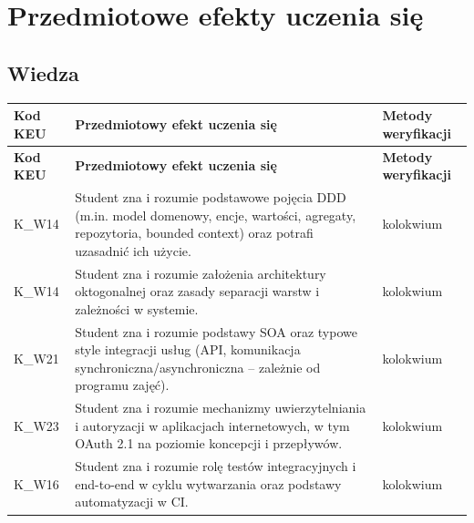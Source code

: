 \documentclass[12pt, a4paper]{article}
\newcommand{\thdrule}{\noalign{\global\setlength{\extrarowheight}{0pt}}}
\newcommand{\thdend}{\noalign{\global\setlength{\extrarowheight}{3pt}}}
\begin{document}
\section{Przedmiotowe efekty uczenia się}

\subsection*{Wiedza}
{\scriptsize
\begin{longtable}{m{1.6cm}m{9.0cm}m{4.2cm}}
\thdrule\toprule
\rowcolor{pjatkRed} {\color{white}\footnotesize\textbf{\vphantom{Ag}Kod KEU}} & {\color{white}\footnotesize\textbf{\vphantom{Ag}Przedmiotowy efekt uczenia się}} & {\color{white}\footnotesize\textbf{\vphantom{Ag}Metody weryfikacji}} \\
\midrule\thdend
\endfirsthead
\thdrule\toprule
\rowcolor{pjatkRed} {\color{white}\footnotesize\textbf{\vphantom{Ag}Kod KEU}} & {\color{white}\footnotesize\textbf{\vphantom{Ag}Przedmiotowy efekt uczenia się}} & {\color{white}\footnotesize\textbf{\vphantom{Ag}Metody weryfikacji}} \\
\midrule\thdend
\endhead
  \rowcolor{tableRowLight} K\_W14 & Student zna i rozumie podstawowe pojęcia DDD (m.in. model domenowy, encje, wartości, agregaty, repozytoria, bounded context) oraz potrafi uzasadnić ich użycie. & kolokwium \\
  \rowcolor{tableRowAlt} K\_W14 & Student zna i rozumie założenia architektury oktogonalnej oraz zasady separacji warstw i zależności w systemie. & kolokwium \\
  \rowcolor{tableRowLight} K\_W21 & Student zna i rozumie podstawy SOA oraz typowe style integracji usług (API, komunikacja synchroniczna/asynchroniczna – zależnie od programu zajęć). & kolokwium \\
  \rowcolor{tableRowAlt} K\_W23 & Student zna i rozumie mechanizmy uwierzytelniania i autoryzacji w aplikacjach internetowych, w tym OAuth 2.1 na poziomie koncepcji i przepływów. & kolokwium \\
  \rowcolor{tableRowLight} K\_W16 & Student zna i rozumie rolę testów integracyjnych i end-to-end w cyklu wytwarzania oraz podstawy automatyzacji w CI. & kolokwium \\
\bottomrule
\end{longtable}}
\end{document}
